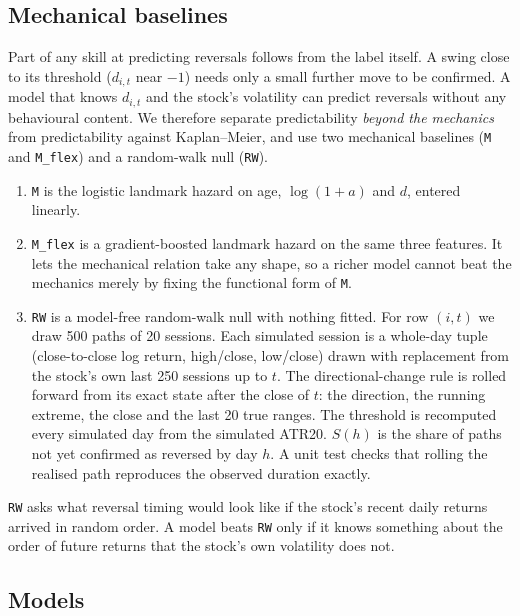 \subsection{Mechanical baselines}\label{sec:mech}

Part of any skill at predicting reversals follows from the label itself. A swing close to its
threshold ($d_{i,t}$ near $-1$) needs only a small further move to be confirmed. A model that knows
$d_{i,t}$ and the stock's volatility can predict reversals without any behavioural content. We
therefore separate predictability \emph{beyond the mechanics} from predictability against
Kaplan--Meier, and use two mechanical baselines (\texttt{M} and \texttt{M\_flex}) and a
random-walk null (\texttt{RW}).

\begin{enumerate}
\item \texttt{M} is the logistic landmark hazard on age, $\log(1+a)$ and $d$, entered linearly.
\item \texttt{M\_flex} is a gradient-boosted landmark hazard on the same three features. It lets
  the mechanical relation take any shape, so a richer model cannot beat the mechanics merely by
  fixing the functional form of \texttt{M}.
\item \texttt{RW} is a model-free random-walk null with nothing fitted. For row $(i,t)$ we draw 500
  paths of 20 sessions. Each simulated session is a whole-day tuple (close-to-close log return,
  high/close, low/close) drawn with replacement from the stock's own last 250 sessions up to $t$.
  The directional-change rule is rolled forward from its exact state after the close of $t$: the
  direction, the running extreme, the close and the last 20 true ranges. The threshold is
  recomputed every simulated day from the simulated ATR20. $S(h)$ is the share of paths not yet
  confirmed as reversed by day $h$. A unit test checks that rolling the realised path reproduces the
  observed duration exactly.
\end{enumerate}

\texttt{RW} asks what reversal timing would look like if the stock's recent daily returns arrived in random
order. A model beats \texttt{RW} only if it knows something about the order of future returns that the
stock's own volatility does not.

\subsection{Models}\label{sec:models}

